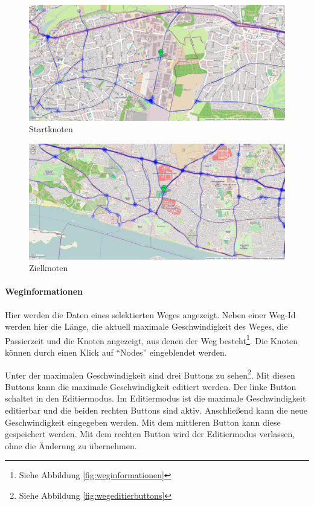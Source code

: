 \begin{figure}[htbp]
  \centering
  \includegraphics[width=\textwidth]{Bilder/Startknoten.png}
  \caption{Startknoten}
  \label{fig:startknoten}
\end{figure}

\begin{figure}[htbp]
  \centering
  \includegraphics[width=\textwidth]{Bilder/Zielknoten.png}
  \caption{Zielknoten}
  \label{fig:zielknoten}
\end{figure}

\paragraph{Weginformationen}
\label{sec:weginformationen}

Hier werden die Daten eines selektierten Weges angezeigt.
Neben einer Weg-Id werden hier die Länge, die aktuell maximale Geschwindigkeit des Weges, die Passierzeit und die Knoten angezeigt, aus denen der Weg besteht\footnote{Siehe Abbildung \ref{fig:weginformationen}}.
Die Knoten können durch einen Klick auf ``Nodes'' eingeblendet werden.

Unter der maximalen Geschwindigkeit sind drei Buttons zu sehen\footnote{Siehe Abbildung \ref{fig:wegeditierbuttons}}.
Mit diesen Buttons kann die maximale Geschwindigkeit editiert werden.
Der linke Button schaltet in den Editiermodus.
Im Editiermodus ist die maximale Geschwindigkeit editierbar und die beiden rechten Buttons sind aktiv.
Anschließend kann die neue Geschwindigkeit eingegeben werden.
Mit dem mittleren Button kann diese gespeichert werden.
Mit dem rechten Button wird der Editiermodus verlassen, ohne die Änderung zu übernehmen.

